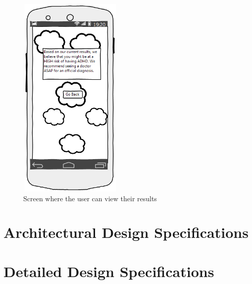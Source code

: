 \documentclass[a4wide]{article}
\begin{document}
\begin{figure}[H]
\centering
\includegraphics[height=10cm, width = 5cm]{images/diagnosis_screen.png}
\caption{Screen where the user can view their results}
\label{fig:diagnosis_screen}
\end{figure}


\section{Architectural Design Specifications}
\section{Detailed Design Specifications}
\end{document}
